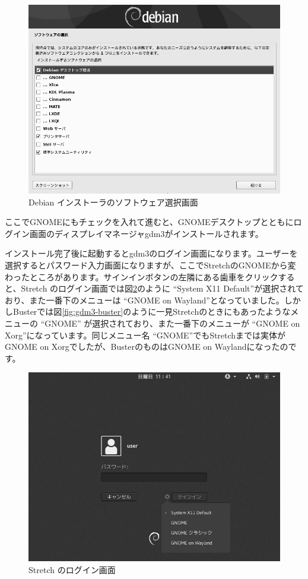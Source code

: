 \documentclass[mingoth,a4paper]{jsarticle}
\begin{document}
\begin{figure}[h]
\begin{center}
\includegraphics[keepaspectratio,width=0.7\hsize]{image201907/buster_tasksel_0_gray.png}
\end{center}
\caption{Debian インストーラのソフトウェア選択画面}
\label{fig:d-i-tasksel}
\end{figure}

ここでGNOMEにもチェックを入れて進むと、GNOMEデスクトップとともにログイン画面のディスプレイマネージャgdm3がインストールされます。

インストール完了後に起動するとgdm3のログイン画面になります。ユーザーを選択するとパスワード入力画面になりますが、ここでStretchのGNOMEから変わったところがあります。サインインボタンの左隣にある歯車をクリックすると、Stretch のログイン画面では図\ref{fig:gdm3-stretch}のように ``System X11 Default''が選択されており、また一番下のメニューは ``GNOME on Wayland''となっていました。しかしBusterでは図\ref{fig:gdm3-buster}のように一見Stretchのときにもあったようなメニューの ``GNOME'' が選択されており、また一番下のメニューが ``GNOME on Xorg''になっています。同じメニュー名 ``GNOME''でもStretchまでは実体がGNOME on Xorgでしたが、BusterのものはGNOME on Waylandになったのです。

\begin{figure}[h]
\begin{center}
\includegraphics[keepaspectratio,width=0.7\hsize]{image201907/stretch_gnome_0_gray.png}
\end{center}
\caption{Stretch のログイン画面}
\label{fig:gdm3-stretch}
\end{figure}
\end{document}
